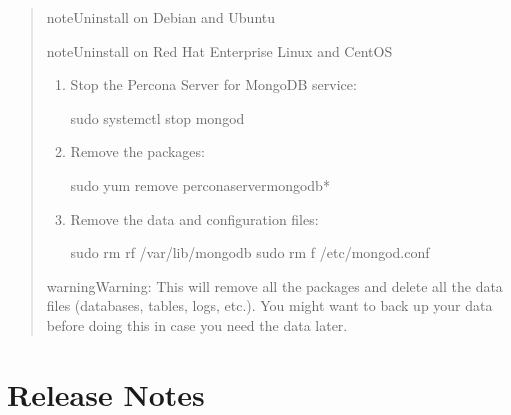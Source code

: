 \documentclass[letterpaper,10pt,english]{sphinxmanual}
\begin{document}
\begin{quote}
\begin{sphinxadmonition}{note}{Uninstall on Debian and Ubuntu}
\begin{enumerate}
\begin{itemize}
\end{itemize}

\end{enumerate}
\end{sphinxadmonition}

\begin{sphinxadmonition}{note}{Uninstall on Red Hat Enterprise Linux and CentOS}
\begin{enumerate}
%
\item {} 
\sphinxAtStartPar
Stop the Percona Server for MongoDB service:

\begin{sphinxVerbatim}[commandchars=\\\{\}]
\PYGZdl{} sudo systemctl stop mongod
\end{sphinxVerbatim}

\item {} 
\sphinxAtStartPar
Remove the packages:

\begin{sphinxVerbatim}[commandchars=\\\{\}]
\PYGZdl{} sudo yum remove percona\PYGZhy{}server\PYGZhy{}mongodb*
\end{sphinxVerbatim}

\item {} 
\sphinxAtStartPar
Remove the data and configuration files:

\begin{sphinxVerbatim}[commandchars=\\\{\}]
\PYGZdl{} sudo rm \PYGZhy{}rf /var/lib/mongodb
\PYGZdl{} sudo rm \PYGZhy{}f /etc/mongod.conf
\end{sphinxVerbatim}

\end{enumerate}

\begin{sphinxadmonition}{warning}{Warning:}
\sphinxAtStartPar
This will remove all the packages and delete all the data files (databases, tables, logs, etc.).  You might want to back up your data before doing this in case you need the data later.
\end{sphinxadmonition}
\end{sphinxadmonition}
\end{quote}


\part{Release Notes}
\label{\detokenize{index:release-notes}}
\end{document}
